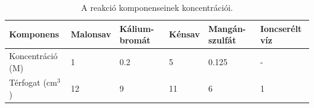 \begin{table}[]
\centering
\caption{A reakció komponenseinek koncentrációi.}
\label{my-label}
\begin{tabular}{llllll}
Komponens                       & Malonsav & Kálium-bromát & Kénsav & Mangán-szulfát & Ioncserélt víz \\
\hline
Koncentráció (M)                & 1        & 0.2           & 5      & 0.125          & -              \\
Térfogat (cm$^3$) & 12       & 9             & 11     & 6              & 1              \\
\end{tabular}
\end{table}



